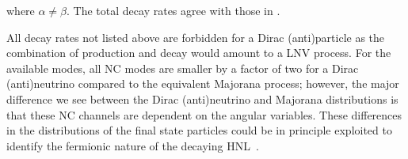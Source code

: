 where $\alpha \neq \beta$.
The total decay rates agree with those in .  
%
%

All decay rates not listed above are forbidden for a Dirac (anti)particle as the combination of production %
and decay would amount to a LNV process.
% 
For the available modes, all NC modes are smaller by a factor of two for a Dirac (anti)neutrino compared %
to the equivalent Majorana process; however, the major difference we see between the Dirac (anti)neutrino and Majorana distributions %
is that these NC channels are dependent on the angular variables.
These differences in the distributions of the final state particles could be in principle exploited to identify %
the fermionic nature of the decaying HNL~\cite{Balantekin:2018ukw}.





